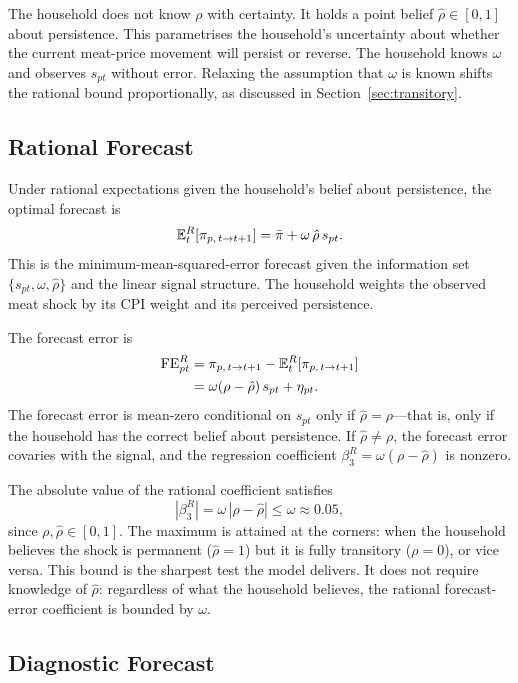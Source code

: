 The household does not know $\rho$ with certainty.
It holds a point belief $\hat{\rho} \in [0,1]$ about
persistence.
This parametrises the household's uncertainty about whether
the current meat-price movement will persist or reverse.
The household knows $\omega$ and observes $s_{pt}$ without
error.
Relaxing the assumption that $\omega$ is known shifts the
rational bound proportionally, as discussed in
Section~\ref{sec:transitory}.

\subsection{Rational Forecast}

Under rational expectations given the household's belief
about persistence, the optimal forecast is
\[
  \mathbb{E}_t^R[\pi_{p,\,t \to t+1}]
  = \bar{\pi} + \omega\,\hat{\rho}\,s_{pt}.
\]
This is the minimum-mean-squared-error forecast given the
information set $\{s_{pt}, \omega, \hat{\rho}\}$ and the
linear signal structure.
The household weights the observed meat shock by its CPI
weight and its perceived persistence.

The forecast error is
\begin{align}
  \mathrm{FE}^R_{pt}
  &= \pi_{p,\,t \to t+1}
    - \mathbb{E}_t^R[\pi_{p,\,t \to t+1}] \notag \\
  &= \omega(\rho - \hat{\rho})\,s_{pt} + \eta_{pt}.
    \label{eq:app_rational_fe}
\end{align}
The forecast error is mean-zero conditional on $s_{pt}$ only
if $\hat{\rho} = \rho$---that is, only if the household has
the correct belief about persistence.
If $\hat{\rho} \neq \rho$, the forecast error covaries with
the signal, and the regression coefficient
$\beta_3^R = \omega(\rho - \hat{\rho})$ is nonzero.

The absolute value of the rational coefficient satisfies
\[
  |\beta_3^R| = \omega\,|\rho - \hat{\rho}|
  \leq \omega
  \approx 0.05,
\]
since $\rho, \hat{\rho} \in [0,1]$.
The maximum is attained at the corners: when the household
believes the shock is permanent ($\hat{\rho} = 1$) but it is
fully transitory ($\rho = 0$), or vice versa.
This bound is the sharpest test the model delivers.
It does not require knowledge of $\hat{\rho}$: regardless of
what the household believes, the rational forecast-error
coefficient is bounded by $\omega$.

\subsection{Diagnostic Forecast}

